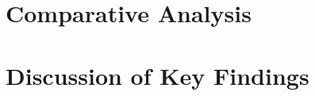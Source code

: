     
    \section{Comparative Analysis}
        
    \section{Discussion of Key Findings}

\cleardoublepage